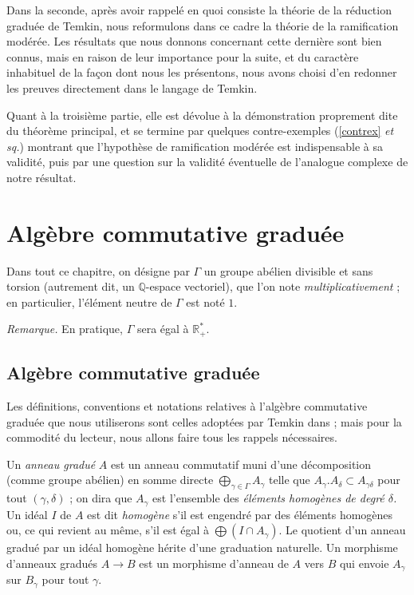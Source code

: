 \documentclass[10pt,leqno]{article}
\renewcommand{\Bbb}{\mathbb}
\newcommand{\RR}{{\Bbb R}}
\newcommand{\QQ}{{\Bbb Q}}
\newcommand{\deux}[1]{\refstepcounter{subsection}\label{#1}\medskip\noindent {\bf (\thesubsection)}\hspace{.1cm}}
\begin{document}
\begin{itemize}
\medskip
Dans la seconde, après avoir rappelé en quoi consiste la théorie de la réduction graduée de Temkin, nous reformulons dans ce cadre la théorie de la ramification modérée. Les résultats que nous donnons concernant cette dernière sont bien connus, mais en raison de leur importance pour la suite, et du caractère inhabituel de la façon dont nous les présentons, nous avons choisi d'en redonner les preuves directement dans le langage de Temkin.

\medskip
 Quant à la troisième partie, elle est dévolue à la démonstration proprement dite du théorème principal, et se termine par quelques contre-exemples (\ref{contrex} {\em et sq.}) montrant que l'hypothèse de ramification modérée est indispensable à sa validité, puis par une question sur la validité éventuelle de l'analogue complexe de notre résultat. 
 
\end{itemize}



\section{Algèbre commutative graduée}\label{RAMI}

\medskip
Dans tout ce chapitre, on désigne par $\Gamma$ un groupe abélien divisible et sans torsion (autrement dit, un $\QQ$-espace vectoriel), que l'on note {\em multiplicativement} ; en particulier, l'élément neutre de $\Gamma$ est noté $1$. 

\medskip
{\em Remarque.} En pratique, $\Gamma$ sera égal à $\RR^*_+$. 

\subsection*{Algèbre commutative graduée} 

Les définitions, conventions et notations relatives à l'algèbre commutative graduée que nous utiliserons sont celles adoptées par Temkin dans \cite{tmk2} ; mais pour la commodité du lecteur, nous allons faire tous les rappels nécessaires. 

\deux{introalggrad} Un {\em anneau gradué} $A$ est un anneau commutatif muni d'une décomposition (comme groupe abélien) en somme directe $\bigoplus \limits_{\gamma \in \Gamma}  A_\gamma$ telle que $ A_\gamma. A_\delta\subset  A_{\gamma\delta}$ pour tout $(\gamma, \delta)$ ; on dira que $ A_\gamma$ est l'ensemble des {\em éléments homogènes de degré $\delta$.} Un idéal $ I$ de $ A$ est dit {\em homogène} s'il est engendré par des éléments homogènes ou, ce qui revient au même, s'il est égal à $\bigoplus ( I\cap  A_\gamma)$. Le quotient d'un anneau gradué par un idéal homogène hérite d'une graduation naturelle. Un morphisme d'anneaux gradués $ A\to  B$ est un morphisme d'anneau de $ A$ vers $ B$ qui envoie $ A_{\gamma}$ sur $ B_{\gamma}$ pour tout $\gamma$. 
\end{document}
